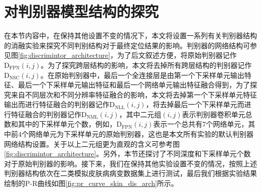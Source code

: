 \section{对判别器模型结构的探究}\label{sec:dis_arch}
在本节内容中，在保持其他设置不变的情况下，本文将设置一系列有关判别器结构的消融实验来探究不同判别结构对于最终定位结果的影响。判别器的网络结构可参见图\ref{fig:discrimintor_architecture}，为了后文叙述方便，将原始判别器记作$\mathrm{D}_\mathrm{FPN}(i,j)$。为了探究跨层结构的影响，本文将去掉所有跨层结构的判别器记作$\mathrm{D}_\mathrm{NSC}(i,j)$。在原始判别器中，最后一个全连接层是由第一个下采样单元输出特征、最后一个下采样单元输出特征和最后一个网络单元输出特征融合得到，为了探究来自不同层次和不同分辨率特征融合的影响，本文将去掉第一个下采样单元特征输出而进行特征融合的判别器记作$\mathrm{D}_\mathrm{NLL}(i,j)$，将去掉最后一个下采样单元而进行特征融合的判别器记作$\mathrm{D}_\mathrm{NML}(i,j)$，其中二元组$(i,j)$表示判别器卷积单元总数和其中的下采样单元个数，例如，$\mathrm{D}_\mathrm{FPN}(i,j)$表示一个总共有$7$个网络单元，其中前$4$个网络单元为下采样单元的原始判别器，这也是本文所有实验的默认判别器网络结构设置。关于以上二元组更为直观的含义可参考图\ref{fig:discrimintor_architecture}。另外，本节还探讨了不同深度和下采样单元个数对于原始判别器的影响。接下来，我们在保持其他实验设置不变的情况，按照上述判别器结构依次在二类模拟皮肤病病变数据集上进行测试，最后我们根据实验结果绘制的P-R曲线如图\ref{fig:pr_curve_skin_dis_arch}所示。
